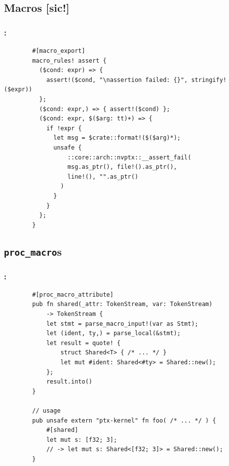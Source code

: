 \documentclass[aspectratio=43, t]{beamer}
\begin{document}
\subsection*{Macros [sic!]}
\begin{frame}[fragile]
	\frametitle{\secname: \subsecname}

	\begin{verbatim}
		#[macro_export]
		macro_rules! assert {
		  ($cond: expr) => {
		    assert!($cond, "\nassertion failed: {}", stringify!($expr))
		  };
		  ($cond: expr,) => { assert!($cond) };
		  ($cond: expr, $($arg: tt)+) => {
		    if !expr {
		      let msg = $crate::format!($($arg)*);
		      unsafe {
		          ::core::arch::nvptx::__assert_fail(
		          msg.as_ptr(), file!().as_ptr(),
		          line!(), "".as_ptr()
		        )
		      }
		    }
		  };
		}
	\end{verbatim}
\end{frame}

\subsection*{\texorpdfstring{\texttt{proc\_macro}s}{proc\_macros}}
\begin{frame}[fragile]
	\frametitle{\secname: \subsecname}

	\begin{verbatim}
		#[proc_macro_attribute]
		pub fn shared(_attr: TokenStream, var: TokenStream)
			-> TokenStream {
			let stmt = parse_macro_input!(var as Stmt);
			let (ident, ty,) = parse_local(&stmt);
			let result = quote! {
				struct Shared<T> { /* ... */ }
				let mut #ident: Shared<#ty> = Shared::new();
			};
			result.into()
		}

		// usage
		pub unsafe extern "ptx-kernel" fn foo( /* ... */ ) {
			#[shared]
			let mut s: [f32; 3];
			// -> let mut s: Shared<[f32; 3]> = Shared::new();
		}
	\end{verbatim}

\end{frame}
\end{document}
